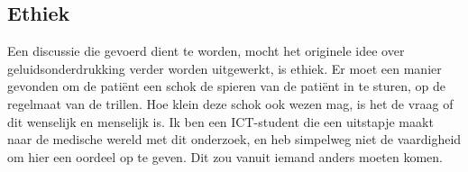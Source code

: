 \subsection*{Ethiek}

Een discussie die gevoerd dient te worden,
mocht het originele idee over geluidsonderdrukking verder worden uitgewerkt, is ethiek.
Er moet een manier gevonden om de patiënt een schok de spieren van de patiënt in te sturen,
op de regelmaat van de trillen. Hoe klein deze schok ook wezen mag,
is het de vraag of dit wenselijk en menselijk is.
Ik ben een ICT-student die een uitstapje maakt naar de medische wereld met dit onderzoek,
en heb simpelweg niet de vaardigheid om hier een oordeel op te geven.
Dit zou vanuit iemand anders moeten komen.